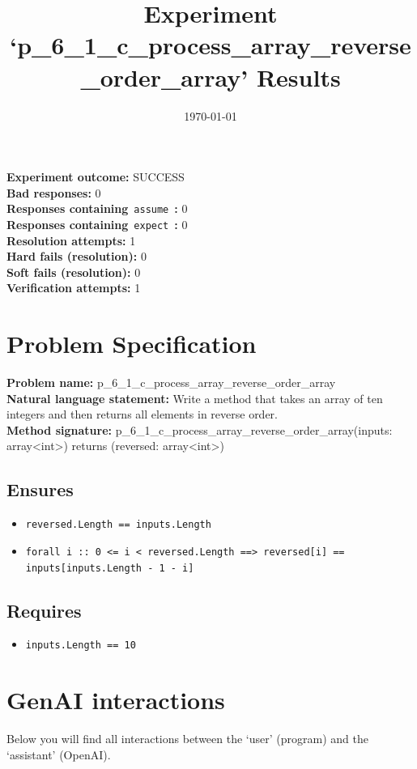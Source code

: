 \documentclass{article}
\begin{document}
\title{Experiment `p\_6\_1\_c\_process\_array\_reverse\_order\_array' Results}
\author{\today}
\date{}
\maketitle
\textbf{Experiment outcome: }SUCCESS
\\\textbf{Bad responses: }0
\\\textbf{Responses containing}~\texttt{assume}~\textbf{: }0
\\\textbf{Responses containing}~\texttt{expect}~\textbf{: }0
\\\textbf{Resolution attempts: }1
\\\textbf{Hard fails (resolution): }0
\\\textbf{Soft fails (resolution): }0
\\\textbf{Verification attempts: }1
\section*{Problem Specification}
\textbf{Problem name: }p\_6\_1\_c\_process\_array\_reverse\_order\_array
\\\textbf{Natural language statement: }Write a method that takes an array of ten integers and then returns all elements in reverse order.
\\\textbf{Method signature: }p\_6\_1\_c\_process\_array\_reverse\_order\_array(inputs: array<int>) returns (reversed: array<int>)
\subsection*{Ensures}
\begin{itemize}
\item \texttt{reversed.Length == inputs.Length}
\item \texttt{forall i :: 0 <= i < reversed.Length ==> reversed[i] == inputs[inputs.Length - 1 - i]}
\end{itemize}
\subsection*{Requires}
\begin{itemize}
\item \texttt{inputs.Length == 10}
\end{itemize}
\clearpage
\section*{GenAI interactions}
Below you will find all interactions between the `user' (program) and the `assistant' (OpenAI).
\end{document}
